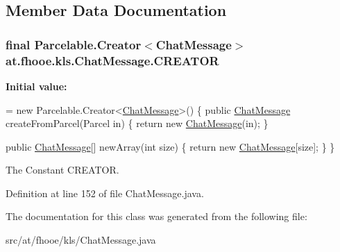 \subsection{Member Data Documentation}
\hypertarget{classat_1_1fhooe_1_1kls_1_1_chat_message_a47d2bb14055a3658494149a471270b90}{
\subsubsection[{C\-R\-E\-A\-T\-O\-R}]{\setlength{\rightskip}{0pt plus 5cm}final Parcelable.\-Creator$<${\bf Chat\-Message}$>$ at.\-fhooe.\-kls.\-Chat\-Message.\-C\-R\-E\-A\-T\-O\-R\hspace{0.3cm}{\ttfamily [static]}}}\label{classat_1_1fhooe_1_1kls_1_1_chat_message_a47d2bb14055a3658494149a471270b90}
{\bfseries Initial value\-:}
\begin{DoxyCode}
= \textcolor{keyword}{new} Parcelable.Creator<\hyperlink{classat_1_1fhooe_1_1kls_1_1_chat_message_a24f4cb9756c0eb7a168ddf2e6f80b05d}{ChatMessage}>() \{
        \textcolor{keyword}{public} \hyperlink{classat_1_1fhooe_1_1kls_1_1_chat_message_a24f4cb9756c0eb7a168ddf2e6f80b05d}{ChatMessage} createFromParcel(Parcel in) \{
            \textcolor{keywordflow}{return} \textcolor{keyword}{new} \hyperlink{classat_1_1fhooe_1_1kls_1_1_chat_message_a24f4cb9756c0eb7a168ddf2e6f80b05d}{ChatMessage}(in);
        \}

        \textcolor{keyword}{public} \hyperlink{classat_1_1fhooe_1_1kls_1_1_chat_message_a24f4cb9756c0eb7a168ddf2e6f80b05d}{ChatMessage}[] newArray(\textcolor{keywordtype}{int} size) \{
            \textcolor{keywordflow}{return} \textcolor{keyword}{new} \hyperlink{classat_1_1fhooe_1_1kls_1_1_chat_message_a24f4cb9756c0eb7a168ddf2e6f80b05d}{ChatMessage}[size];
        \}
    \}
\end{DoxyCode}
The Constant C\-R\-E\-A\-T\-O\-R. 

Definition at line 152 of file Chat\-Message.\-java.



The documentation for this class was generated from the following file\-:\begin{DoxyCompactItemize}
\item 
src/at/fhooe/kls/Chat\-Message.\-java\end{DoxyCompactItemize}
